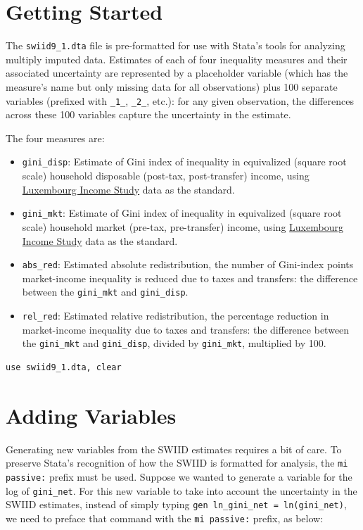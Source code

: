 \documentclass[11pt]{article}
\begin{document}
\section{Getting Started}
The \verb+swiid9_1.dta+ file is pre-formatted for use with Stata's tools for analyzing multiply imputed data.  Estimates of each of four inequality measures and their associated uncertainty are represented by a placeholder variable (which has the measure's name but only missing data for all observations) plus 100 separate variables (prefixed with \verb+_1_+, \verb+_2_+, etc.): for any given observation, the differences across these 100 variables capture the uncertainty in the estimate.   

The four measures are:
\begin{itemize}
	\item \verb+gini_disp+: Estimate of Gini index of inequality in equivalized (square root scale) household disposable (post-tax, post-transfer) income, using \href{http://www.lisdatacenter.org}{Luxembourg Income Study} data as the standard.
	\item \verb+gini_mkt+: Estimate of Gini index of inequality in equivalized (square root scale) household market (pre-tax, pre-transfer) income, using \href{http://www.lisdatacenter.org}{Luxembourg Income Study} data as the standard.	
	\item \verb+abs_red+: Estimated absolute redistribution, the number of Gini-index points market-income inequality is reduced due to taxes and transfers: the difference between the \verb+gini_mkt+ and \verb+gini_disp+.
	\item \verb+rel_red+: Estimated relative redistribution, the percentage reduction in market-income inequality due to taxes and transfers: the difference between the \verb+gini_mkt+ and \verb+gini_disp+, divided by \verb+gini_mkt+, multiplied by 100.
\end{itemize}

\begin{verbatim}
use swiid9_1.dta, clear
\end{verbatim}

\section{Adding Variables}
Generating new variables from the SWIID estimates requires a bit of care.  To preserve Stata's recognition of how the SWIID is formatted for analysis, the \verb+mi passive:+ prefix must be used.  Suppose we wanted to generate a variable for the log of \verb+gini_net+.  For this new variable to take into account the uncertainty in the SWIID estimates, instead of simply typing \verb+gen ln_gini_net = ln(gini_net)+, we need to preface that command with the \verb+mi passive:+ prefix, as below:
\end{document}
